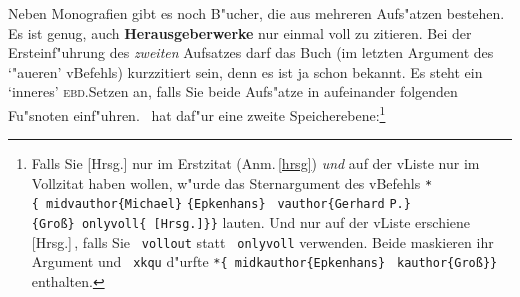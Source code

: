 \documentclass[12pt,a4paper]{article}
\newcommand{\pbs}{\string\ \unskip}
\newcommand{\bs}{\protect\pbs}
\begin{document}
\vspace{2ex}\noindent
Neben Monografien gibt es noch B"ucher, die aus mehreren Aufs"atzen bestehen. 
Es ist genug, auch \textbf{Herausgeberwerke} nur einmal voll zu zitieren. Bei der 
Ersteinf"uhrung des \textit{zweiten} Aufsatzes darf das Buch (im letzten 
Argument des `"au\hyss eren' v\fhy Befehls) kurzzitiert sein, denn es ist ja schon 
bekannt. Es steht ein `inneres' \textsc{ebd.}\hy Setzen an, falls Sie beide 
Aufs"atze in aufeinander folgenden Fu"snoten einf"uhren. \BibArts\ 
hat daf"ur eine zweite Speicherebene:\footnote{Falls Sie \hspace{.2em}\textsf{[Hrsg.]} \hspace{.2em}nur
im Erstzitat (Anm.\,\ref{hrsg}) \textit{und} auf der v\fhy Liste nur im Vollzitat haben wollen, w"urde
das Sternargument des v\fhy Befehls
\hspace{.2em}\texttt{*\{\bs midvauthor\{Michael\}} \texttt{\{Epkenhans\}} \texttt{\bs vauthor\{Gerhard} \texttt{P.\}\{Groß\}\bs onlyvoll\{ [Hrsg.]\}\}}
\hspace{.2em}lauten. 
Und nur auf der v\fhy Liste erschiene \hspace{.1em}\textsf{[Hrsg.]}\,, falls Sie \texttt{\bs vollout} statt
\texttt{\bs onlyvoll} verwenden.
Beide maskieren ihr Argument und \hspace{.2em}\texttt{\bs xkqu} \hspace{.2em}d"urfte 
\hspace{.2em}\texttt{*\{\bs midkauthor\{Epkenhans\}} \texttt{\bs kauthor\{Groß\}\}}
\hspace{.2em}enthalten.}
\end{document}
